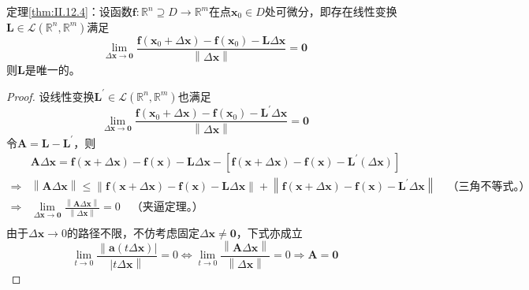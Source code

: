 \documentclass[main.tex]{subfiles}
\begin{document}
\begin{theorem*}[必要条件之唯一性]
定理\ref{thm:II.12.4}：设函数$\mathbf{f}:\mathbb{R}^n\supseteq D\rightarrow\mathbb{R}^m$在点$\mathbf{x}_0\in D$处可微分，即存在线性变换$\mathbf{L}\in\mathcal{L}\left(\mathbb{R}^n,\mathbb{R}^m\right)$满足
\[
\lim_{\Delta\mathbf{x}\to\mathbf{0}}\frac{\mathbf{f}\left(\mathbf{x}_0+\Delta \mathbf{x}\right)-\mathbf{f}\left(\mathbf{x}_0\right)-\mathbf{L}\Delta\mathbf{x}}{\left\|\Delta\mathbf{x}\right\|}=\mathbf{0}
\]
则$\mathbf{L}$是唯一的。
\end{theorem*}
\begin{proof}
设线性变换$\mathbf{L}^\prime\in\mathcal{L}\left(\mathbb{R}^n,\mathbb{R}^m\right)$也满足
\[
\lim_{\Delta\mathbf{x}\to\mathbf{0}}\frac{\mathbf{f}\left(\mathbf{x}_0+\Delta \mathbf{x}\right)-\mathbf{f}\left(\mathbf{x}_0\right)-\mathbf{L}^\prime\Delta\mathbf{x}}{\left\|\Delta\mathbf{x}\right\|}=\mathbf{0}
\]
令$\mathbf{A}=\mathbf{L}-\mathbf{L}^\prime$，则
\begin{align*}
   &\mathbf{A}\Delta\mathbf{x}=\mathbf{f}\left(\mathbf{x}+\Delta\mathbf{x}\right)-\mathbf{f}\left(\mathbf{x}\right)-\mathbf{L}\Delta\mathbf{x}-\left[\mathbf{f}\left(\mathbf{x}+\Delta\mathbf{x}\right)-\mathbf{f}\left(\mathbf{x}\right)-\mathbf{L}^\prime\left(\Delta\mathbf{x}\right)\right]\\
   \Rightarrow&\left\|\mathbf{A}\Delta\mathbf{x}\right\|\leq\left\|\mathbf{f}\left(\mathbf{x}+\Delta\mathbf{x}\right)-\mathbf{f}\left(\mathbf{x}\right)-\mathbf{L}\Delta\mathbf{x}\right\|+\left\|\mathbf{f}\left(\mathbf{x}+\Delta\mathbf{x}\right)-\mathbf{f}\left(\mathbf{x}\right)-\mathbf{L}^\prime\Delta\mathbf{x}\right\|\quad\text{（三角不等式。）}\\
   \Rightarrow&\lim_{\Delta\mathbf{x}\to\mathbf{0}}\frac{\left\|\mathbf{A}\Delta\mathbf{x}\right\|}{\left\|\Delta\mathbf{x}\right\|}=0\quad\text{（夹逼定理。）}\\
\end{align*}
由于$\Delta\mathbf{x}\to0$的路径不限，不仿考虑固定$\Delta\mathbf{x}\neq\mathbf{0}$，下式亦成立
\[\lim_{t\to0}\frac{\left\|\mathbf{a}\left(t\Delta\mathbf{x}\right)\right|}{\left|t\Delta\mathbf{x}\right\|}=0\Leftrightarrow\lim_{t\to0}\frac{\left\|\mathbf{A}\Delta\mathbf{x}\right\|}{\left\|\Delta\mathbf{x}\right\|}=0\Rightarrow\mathbf{A}=\mathbf{0}\]
\end{proof}
\end{document}
